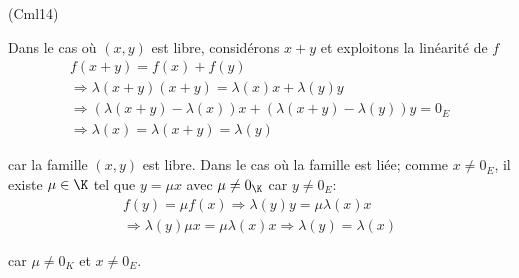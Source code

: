 \begin{tiny}(Cml14)\end{tiny} Dans le cas où $(x,y)$ est libre, considérons $x+y$ et exploitons la linéarité de $f$
\begin{multline*}
  f(x+y)=f(x) + f(y)\\
\Rightarrow \lambda(x+y)(x+y) = \lambda(x) x + \lambda(y) y\\
\Rightarrow \left( \lambda(x+y) -\lambda(x)\right) x + \left( \lambda(x+y) -\lambda(y)\right) y = 0_E \\
\Rightarrow \lambda(x) = \lambda(x+y) = \lambda(y)
\end{multline*}

car la famille $(x,y)$ est libre.\newline
Dans le cas où la famille est liée; comme $x \neq 0_E$, il existe $\mu \in \K$ tel que $y=\mu x$ avec $\mu \neq 0_\K$ car $y \neq 0_E$:
\begin{multline*}
  f(y) = \mu f(x)
\Rightarrow \lambda(y) y = \mu \lambda(x)x \\
\Rightarrow \lambda(y) \mu x = \mu \lambda(x) x
\Rightarrow \lambda(y) = \lambda(x)
\end{multline*}

car $\mu \neq 0_K$ et $x\neq 0_E$.
